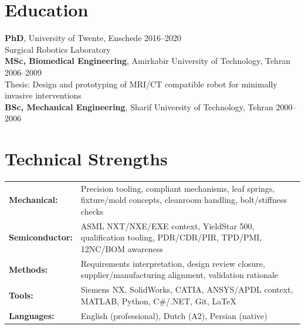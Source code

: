 \documentclass[10pt,a4paper]{article}
\begin{document}
\section{Education}

\textbf{PhD}, University of Twente, Enschede \hfill 2016--2020 \\
{\small Surgical Robotics Laboratory } \\[2pt]
\textbf{MSc, Biomedical Engineering}, Amirkabir University of Technology, Tehran \hfill 2006--2009 \\
{\small Thesis: Design and prototyping of MRI/CT compatible robot for minimally invasive interventions} \\[2pt]
\textbf{BSc, Mechanical Engineering}, Sharif University of Technology, Tehran \hfill 2000--2006

\section{Technical Strengths}
{\small
\begin{tabularx}{\textwidth}{@{}lX@{}}
 \textbf{Mechanical:} & Precision tooling, compliant mechanisms, leaf springs, fixture/mold concepts, cleanroom handling, bolt/stiffness checks \\
 \textbf{Semiconductor:} & ASML NXT/NXE/EXE context, YieldStar 500, qualification tooling, PDR/CDR/PIR, TPD/PMI, 12NC/BOM awareness \\
 \textbf{Methods:} & Requirements interpretation, design review closure, supplier/manufacturing alignment, validation rationale \\
 \textbf{Tools:} & Siemens NX, SolidWorks, CATIA, ANSYS/APDL context, MATLAB, Python, C\#/.NET, Git, \LaTeX \\
 \textbf{Languages:} & English (professional), Dutch (A2), Persian (native) \\
\end{tabularx}
}
\end{document}
